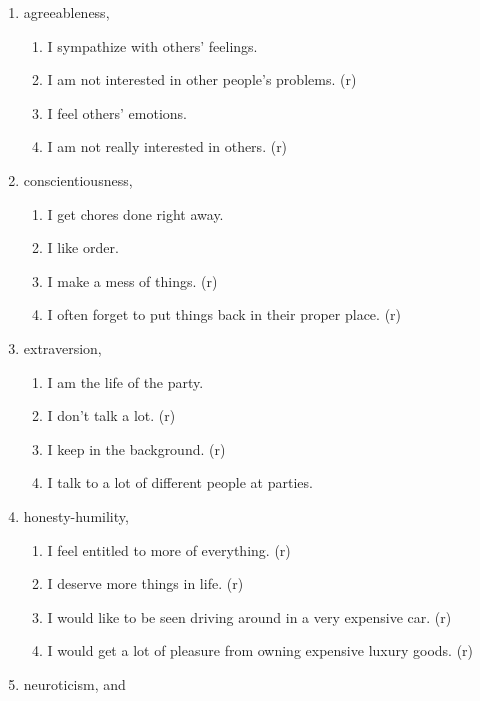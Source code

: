 \documentclass[
  single column]{article}
\providecommand{\tightlist}{%
  \setlength{\itemsep}{0pt}\setlength{\parskip}{0pt}}\usepackage{longtable,booktabs,array}
\begin{document}
\begin{enumerate}
\def\labelenumi{\arabic{enumi}.}
\item
  agreeableness,

  \begin{enumerate}
  \def\labelenumii{\roman{enumii}.}
  \tightlist
  \item
    I sympathize with others' feelings.
  \item
    I am not interested in other people's problems. (r)
  \item
    I feel others' emotions.
  \item
    I am not really interested in others. (r)
  \end{enumerate}
\item
  conscientiousness,

  \begin{enumerate}
  \def\labelenumii{\roman{enumii}.}
  \tightlist
  \item
    I get chores done right away.
  \item
    I like order.
  \item
    I make a mess of things. (r)
  \item
    I often forget to put things back in their proper place. (r)
  \end{enumerate}
\item
  extraversion,

  \begin{enumerate}
  \def\labelenumii{\roman{enumii}.}
  \tightlist
  \item
    I am the life of the party.
  \item
    I don't talk a lot. (r)
  \item
    I keep in the background. (r)
  \item
    I talk to a lot of different people at parties.
  \end{enumerate}
\item
  honesty-humility,

  \begin{enumerate}
  \def\labelenumii{\roman{enumii}.}
  \tightlist
  \item
    I feel entitled to more of everything. (r)
  \item
    I deserve more things in life. (r)
  \item
    I would like to be seen driving around in a very expensive car. (r)
  \item
    I would get a lot of pleasure from owning expensive luxury goods.
    (r)
  \end{enumerate}
\item
  neuroticism, and


\end{enumerate}
\end{document}
